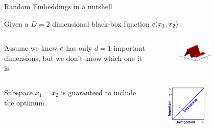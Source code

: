\begin{frame}[c]{Random Embeddings in a nutshell}


Given a $D=2$ dimensional black-box function $c(x_{1},x_{2})$:
\begin{itemize}
\begin{columns}[T]
\begin{column}{0.45\linewidth}


    \item Assume we know $c$ has only $d=1$ important dimensions, but we don't know which one it is.
    \end{column}
    \begin{column}{0.5\linewidth}
        \begin{figure}
    \includegraphics[width=0.5\textwidth]{w06_hpo_bo/images/highdim_images/Random embeddings in a nutshell1.png}
    \end{figure}
    \end{column}
\end{columns}
    \pause
    \begin{columns}[T]
    \begin{column}{0.45\linewidth}
    \vspace{-1em}
    \item Subspace $x_1=x_2$ is guaranteed to include the optimum.
        \end{column}
        \begin{column}{0.5\linewidth}
    \begin{figure}
    \includegraphics[width=0.5\textwidth]{w06_hpo_bo/images/highdim_images/Random embeddings in a nutshell2.png}

\end{figure}
\end{column}
\end{columns}
\end{itemize}
\end{frame}
